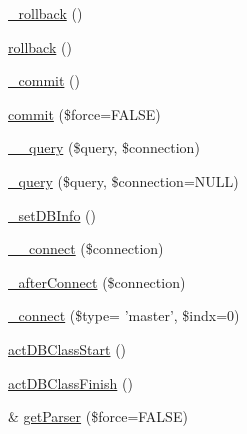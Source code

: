 \begin{DoxyCompactItemize}
\hyperlink{classDB_ac537ae2001731b709a4b60992b04275b}{\+\_\+rollback} ()
\item 
\hyperlink{classDB_a1fb6903379bc241fd318b980b9e30882}{rollback} ()
\item 
\hyperlink{classDB_ae6b44dc80d78b7f73cb6741ff0d63399}{\+\_\+commit} ()
\item 
\hyperlink{classDB_a9e84ef91b522b1cd4d1f0f9a3fe3a57a}{commit} (\$force=F\+A\+L\+S\+E)
\item 
\hyperlink{classDB_a9e93ad499d34fefc40686d35ed9bf18f}{\+\_\+\+\_\+query} (\$query, \$connection)
\item 
\hyperlink{classDB_a740ea0f536b5ffacabf31b3a7473f5a7}{\+\_\+query} (\$query, \$connection=N\+U\+L\+L)
\item 
\hyperlink{classDB_a92f2478aeb03b00432332ad4e4a3d700}{\+\_\+set\+D\+B\+Info} ()
\item 
\hyperlink{classDB_a398b5d8142cab5920d3e037b4f22830e}{\+\_\+\+\_\+connect} (\$connection)
\item 
\hyperlink{classDB_ae9511581ab1229970e061e599b0f2f94}{\+\_\+after\+Connect} (\$connection)
\item 
\hyperlink{classDB_aaa2d517ff3b233e36c7873f288cb38ba}{\+\_\+connect} (\$type= 'master', \$indx=0)
\item 
\hyperlink{classDB_a5aa10d0d5f40cbd7c9b20a84b1c1c307}{act\+D\+B\+Class\+Start} ()
\item 
\hyperlink{classDB_abcdbf61ef5e7c96725c7ea2781f165f4}{act\+D\+B\+Class\+Finish} ()
\item 
\& \hyperlink{classDB_ac1222f2e7a1aae0fcd7d9e906a7a96ba}{get\+Parser} (\$force=F\+A\+L\+S\+E)
\end{DoxyCompactItemize}
